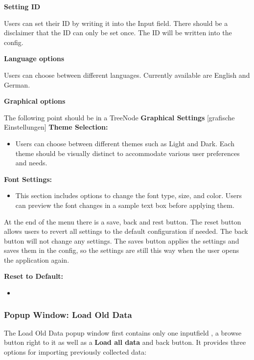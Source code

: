 \documentclass[]{scrreprt}
\begin{document}
\textbf{Setting ID}
\begin{itemize}
    Users can set their ID by writing it into the Input field. There should be a disclaimer that the ID can only be set once. 
    The ID will be written into the config. 
\end{itemize}

\textbf{Language options}
\begin{itemize}
    Users can choose between different languages. Currently available are English and German. 
\end{itemize}

\textbf{Graphical options}

The following point should be in a TreeNode \textbf{Graphical Settings} [grafische Einstellungen]
\textbf{Theme Selection:}
\begin{itemize}
    \item Users can choose between different themes such as Light and Dark. Each theme should be visually distinct to accommodate various user preferences and needs.
\end{itemize}

\textbf{Font Settings:}
\begin{itemize}
    \item This section includes options to change the font type, size, and color. Users can preview the font changes in a sample text box before applying them.
\end{itemize}

At the end of the menu there is a save, back and rest button. The reset button allows users to revert all settings to the default configuration if needed. The back button will not change any settings.
The saves button applies the settings and saves them in the config, so the settings are still this way when the user opens the application again. 

\textbf{Reset to Default:}
\begin{itemize}
    \item 
\end{itemize}

\subsubsection{Popup Window: Load Old Data} \label{cap:PopupWindow_loadoldata}

The Load Old Data popup window first contains only one inputfield , a browse button right to it as well as a \textbf{Load all data} and back button. 
It provides three options for importing previously collected data:
\end{document}
